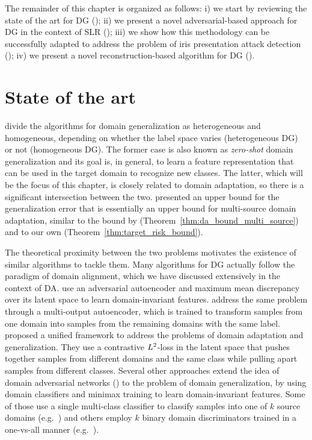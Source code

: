 The remainder of this chapter is organized as follows: i) we start by reviewing the state of the art for DG (); ii) we present a novel adversarial-based approach for DG in the context of SLR (); iii) we show how this methodology can be successfully adapted to address the problem of iris presentation attack detection (); iv) we present a novel reconstruction-based algorithm for DG ().

\section{State of the art}
\label{sec:dg_sota}
\citet{Zhou2021} divide the algorithms for domain generalization as heterogeneous and homogeneous, depending on whether the label space varies (heterogeneous DG) or not (homogeneous DG). The former case is also known as \emph{zero-shot} domain generalization and its goal is, in general, to learn a feature representation that can be used in the target domain to recognize new classes. The latter, which will be the focus of this chapter, is closely related to domain adaptation, so there is a significant intersection between the two. \citet{Albuquerque2019} presented an upper bound for the generalization error that is essentially an upper bound for multi-source domain adaptation, similar to the bound by \citet{Zhao2018} (Theorem~\ref{thm:da_bound_multi_source}) and to our own (Theorem~\ref{thm:target_risk_bound}).

The theoretical proximity between the two problems motivates the existence of similar algorithms to tackle them. Many algorithms for DG actually follow the paradigm of domain alignment, which we have discussed extensively in the context of DA. \citet{Li2018} use an adversarial autoencoder and maximum mean discrepancy over its latent space to learn domain-invariant features. \citet{Ghifary2015} address the same problem through a multi-output autoencoder, which is trained to transform samples from one domain into samples from the remaining domains with the same label. \citet{Motiian2017} proposed a unified framework to address the problems of domain adaptation and generalization. They use a contrastive $L^2$-loss in the latent space that pushes together samples from different domains and the same class while pulling apart samples from different classes. Several other approaches extend the idea of domain adversarial networks (\citet{Ganin2015}) to the problem of domain generalization, by using domain classifiers and minimax training to learn domain-invariant features. Some of those use a single multi-class classifier to classify samples into one of $k$ source domains (e.g.\ \citet{Aslani2020, Matsuura2020}) and others employ $k$ binary domain discriminators trained in a one-vs-all manner (e.g.\ \citet{Shao2019, YaLi2018}).

